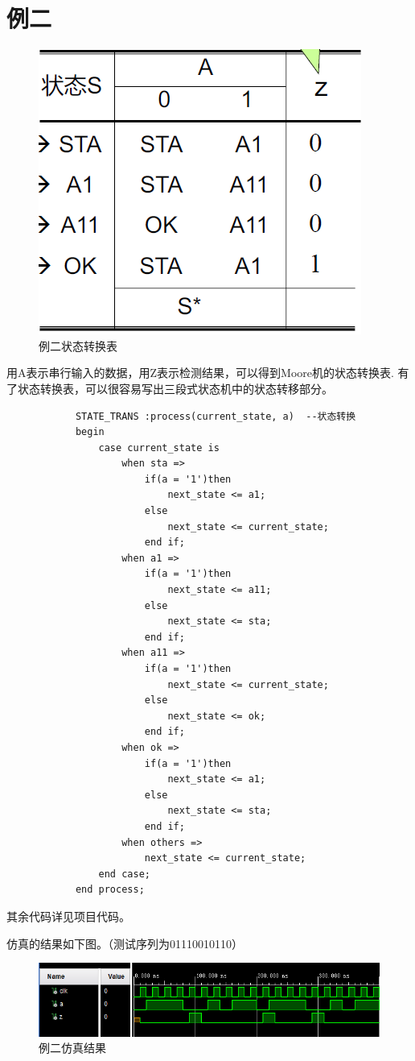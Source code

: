 \documentclass[a4paper]{article}
\begin{document}
	\section{例二}
		\begin{figure}[htbp]
			\centering
			\includegraphics[scale=0.8]{例二状态转换表.png}
			\caption{例二状态转换表}
		\end{figure}
		用A表示串行输入的数据，用Z表示检测结果，可以得到Moore机的状态转换表.
		有了状态转换表，可以很容易写出三段式状态机中的状态转移部分。
		\begin{lstlisting}
			STATE_TRANS :process(current_state, a)  --状态转换
            begin
                case current_state is
                    when sta =>
                        if(a = '1')then
                            next_state <= a1;
                        else
                            next_state <= current_state;
                        end if;
                    when a1 =>
                        if(a = '1')then
                            next_state <= a11;
                        else
                            next_state <= sta;
                        end if;
                    when a11 =>
                        if(a = '1')then
                            next_state <= current_state;
                        else
                            next_state <= ok;
                        end if;
                    when ok =>
                        if(a = '1')then
                            next_state <= a1;
                        else
                            next_state <= sta;
                        end if;
                    when others =>
                        next_state <= current_state;
                end case;
            end process;
		\end{lstlisting}
		其余代码详见项目代码。\par
		仿真的结果如下图。（测试序列为01110010110）
		\begin{figure}[htbp]
			\centering
			\includegraphics[scale=0.85]{例二仿真结果.png}
			\caption{例二仿真结果}
		\end{figure}
\end{document}
